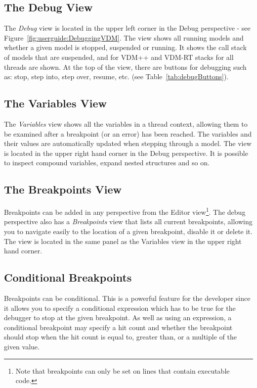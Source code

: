 \documentclass{overturerepchap}
\begin{document}
\subsection{The Debug View}

The \emph{Debug} view is located in the upper left corner in the Debug perspective -
see Figure~\ref{fig:userguide:DebuggingVDM}. The view shows all running
models and whether a given model is stopped, suspended or running.
It shows the call stack of models that are suspended, and for VDM++ and VDM-RT stacks
for all threads are shown.
At the top of the view, there are buttons
for debugging such as: stop, step into, step over, resume, etc. (see
Table~\ref{tab:debugButtons}).

\subsection{The Variables View}
 
The \emph{Variables} view shows all the variables in a thread context, allowing them to be
examined after a breakpoint (or an error) has been reached. The variables and their values are
automatically updated when stepping through a model. The view is
located in the upper right hand corner in the Debug perspective. It is
possible to inspect compound variables, expand nested structures and so
on.

\subsection{The Breakpoints View}

Breakpoints can be added in any perspective from the Editor view\footnote{Note that
breakpoints can only be set on lines that contain executable code.}.
The debug perspective also has a \emph{Breakpoints} view that lists all current
breakpoints, allowing you to navigate easily to the location of a given breakpoint,
disable it or delete it. The view is located in
the same panel as the Variables view in the upper right hand corner.


\subsection{Conditional Breakpoints}
\label{sec:userguide:breakpoints}

Breakpoints can be conditional. This is a powerful feature for the
developer since it allows you to specify a conditional expression 
which has to be true for the debugger to stop at the given breakpoint.
As well as using an expression, a conditional breakpoint may specify a hit
count and whether the breakpoint should stop when the hit count is equal to,
greater than, or a multiple of the given value.
\end{document}

